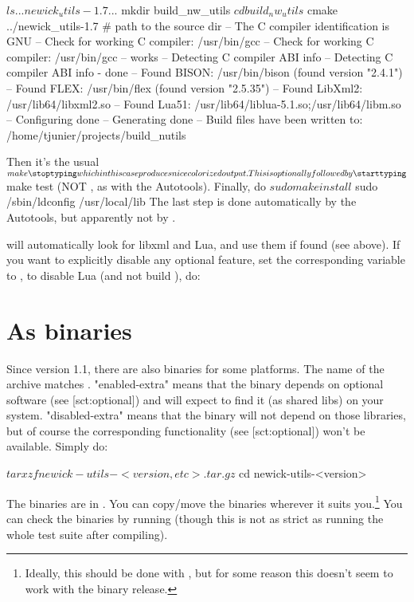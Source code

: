 \starttyping
$ ls
...
newick_utils-1.7
...

$ mkdir build_nw_utils
$ cd build_nw_utils
$ cmake ../newick_utils-1.7		# path to the source dir
-- The C compiler identification is GNU
-- Check for working C compiler: /usr/bin/gcc
-- Check for working C compiler: /usr/bin/gcc -- works
-- Detecting C compiler ABI info
-- Detecting C compiler ABI info - done
-- Found BISON: /usr/bin/bison (found version "2.4.1")
-- Found FLEX: /usr/bin/flex (found version "2.5.35")
-- Found LibXml2: /usr/lib64/libxml2.so 
-- Found Lua51: /usr/lib64/liblua-5.1.so;/usr/lib64/libm.so 
-- Configuring done
-- Generating done
-- Build files have been written to: /home/tjunier/projects/build_nutils
\stoptyping

Then it's the usual
\starttyping
$ make
\stoptyping
which in this case produces nice colorized output. This is optionally followed
by 
\starttyping
$ make test
\stoptyping
(NOT , as with the Autotools). Finally, do
\starttyping
$ sudo make install
$ sudo /sbin/ldconfig /usr/local/lib
\stoptyping
The last step is done automatically by the Autotools, but apparently not by
\cmake.

\cmake{} will automatically look for libxml and Lua, and use them if found (see
above). If you want to explicitly disable any optional feature, set the
corresponding  variable to , \eg{} to disable Lua (and
not build \luaed), do:



\section{As binaries}

Since version 1.1, there are also binaries for some platforms. The name of the
archive matches
.
"enabled-extra" means that the binary depends on optional software (see
\in{}[sct:optional])  and will expect to find it (as shared libs) on your
system. "disabled-extra" means that the binary will not depend on those
libraries, but of course the corresponding functionality (see
\in{}[sct:optional]) won't be available. Simply do: 

\starttyping
$ tar xzf newick-utils-<version,etc>.tar.gz
$ cd newick-utils-<version>
\stoptyping

The binaries are in . You can copy/move the binaries
wherever it suits you.\footnote{Ideally, this should be done with , but for some reason this doesn't seem to work with the binary
release.} You can check the binaries by running 
(though this is not as strict as running the whole test suite after compiling).

